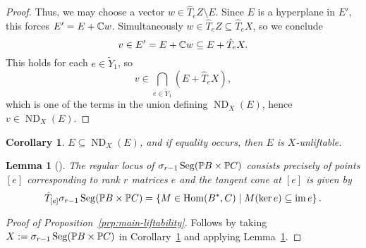 \documentclass[a4paper,10pt]{article}
\def\reg{\text{reg}}
\def\set#1{\left\{#1\right\}}
\DeclareMathOperator{\Hom}{Hom}\let\hom\Hom
\DeclareMathOperator{\im}{im}
\DeclareMathOperator{\ND}{ND}
\DeclareMathOperator{\Seg}{Seg}
\newtheorem{lemma}[theorem]{Lemma}
\newtheorem{corollary}[theorem]{Corollary}
\theoremstyle{definition}
\theoremstyle{remark}
\begin{document}
\begin{proof}
    Thus, we may choose a vector $w\in \hat T_e Z\setminus E$. Since $E$ is a hyperplane in $E'$, this forces $E' = E+\ce w$. Simultaneously $w\in\hat T_e Z \subseteq \hat T_e X$, so we conclude
    \[
        v \in E' = E+\ce w \subseteq E+\hat T_e X.
    \]
    This holds for each $e\in \tilde Y_1$, so
    \[
        v \in \bigcap_{e\in \tilde Y_1}(E+\hat T_e X),
    \]
    which is one of the terms in the union defining $\ND_X(E)$, hence $v\in \ND_X(E)$.
%
\end{proof}


\begin{corollary}
    \label{cor:criterion}
    $E\subseteq \ND_X(E)$, and if equality occurs, then $E$ is $X$-unliftable.
\end{corollary}



\begin{lemma}[{\cite[Lemma 9.]{draisma}}]
    \label{lem:secant-segre-tangent}
    The regular locus of $\sigma_{r-1}\Seg(\pe B\times\pe C)$ consists precisely of points $[e]$ corresponding to rank $r$ matrices $e$ and the tangent cone at $[e]$ is given by \[\hat T_{[e]}\sigma_{r-1}\Seg(\pe B\times\pe C) = \set{M\in \Hom(B^*, C)\mid M(\ker e)\subseteq \im e}.\]
\end{lemma}

\begin{proof}[Proof of Proposition~\ref{prp:main-liftability}]
    Follows by taking $X:= \sigma_{r-1} \Seg(\pe B\times\pe C)$ in Corollary~\ref{cor:criterion} and applying Lemma~\ref{lem:secant-segre-tangent}.
\end{proof}
\end{document}
